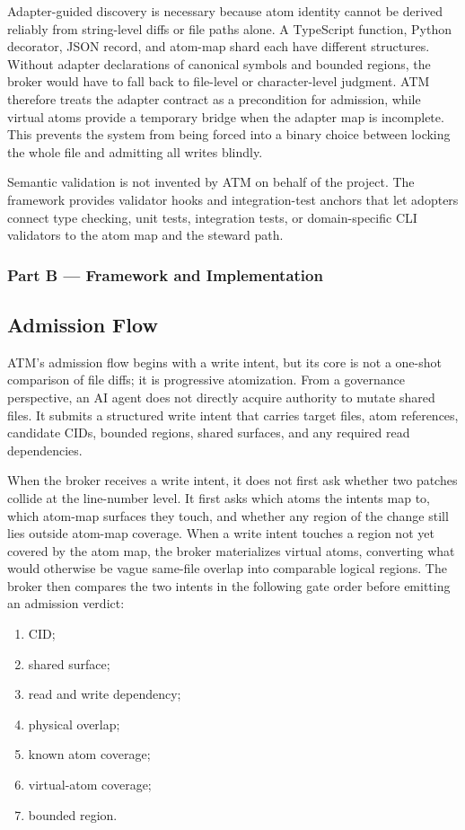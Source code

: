 \documentclass[9pt,letterpaper]{extarticle}
\begin{document}
Adapter-guided discovery is necessary because atom identity cannot be derived reliably from string-level diffs or file paths alone. A TypeScript function, Python decorator, JSON record, and atom-map shard each have different structures. Without adapter declarations of canonical symbols and bounded regions, the broker would have to fall back to file-level or character-level judgment. ATM therefore treats the adapter contract as a precondition for admission, while virtual atoms provide a temporary bridge when the adapter map is incomplete. This prevents the system from being forced into a binary choice between locking the whole file and admitting all writes blindly.

Semantic validation is not invented by ATM on behalf of the project. The framework provides validator hooks and integration-test anchors that let adopters connect type checking, unit tests, integration tests, or domain-specific CLI validators to the atom map and the steward path.

\subsubsection*{Part B --- Framework and Implementation}

\subsection{Admission Flow}

ATM's admission flow begins with a write intent, but its core is not a one-shot comparison of file diffs; it is progressive atomization. From a governance perspective, an AI agent does not directly acquire authority to mutate shared files. It submits a structured write intent that carries target files, atom references, candidate CIDs, bounded regions, shared surfaces, and any required read dependencies.

When the broker receives a write intent, it does not first ask whether two patches collide at the line-number level. It first asks which atoms the intents map to, which atom-map surfaces they touch, and whether any region of the change still lies outside atom-map coverage. When a write intent touches a region not yet covered by the atom map, the broker materializes virtual atoms, converting what would otherwise be vague same-file overlap into comparable logical regions. The broker then compares the two intents in the following gate order before emitting an admission verdict:

\begin{enumerate}
\item CID;
\item shared surface;
\item read and write dependency;
\item physical overlap;
\item known atom coverage;
\item virtual-atom coverage;
\item bounded region.
\end{enumerate}
\end{document}
